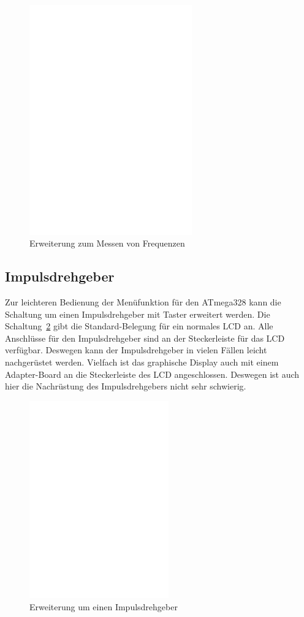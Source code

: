 \begin{figure}[H]
\centering
\includegraphics[width=7cm]{../FIG/Frequency_addon.eps}
\caption{Erweiterung zum Messen von Frequenzen}
\label{fig:FreqMes}
\end{figure}

\subsection{Impulsdrehgeber}

Zur leichteren Bedienung der Menüfunktion für den ATmega328 kann die Schaltung um einen
Impulsdrehgeber mit Taster erweitert werden. Die Schaltung~\ref{fig:RotExt} gibt die Standard-Belegung
für ein normales LCD an. Alle Anschlüsse für den Impulsdrehgeber sind an der Steckerleiste für das LCD 
verfügbar. 
Deswegen kann der Impulsdrehgeber in vielen Fällen leicht nachgerüstet werden. 
Vielfach ist das graphische Display auch mit einem Adapter-Board an die Steckerleiste des LCD angeschlossen. 
Deswegen ist auch hier die Nachrüstung des Impulsdrehgebers nicht sehr schwierig.

\begin{figure}[H]
\centering
\includegraphics[width=6cm]{../FIG/rotary_extension.eps}
\caption{Erweiterung um einen Impulsdrehgeber}
\label{fig:RotExt}
\end{figure}

